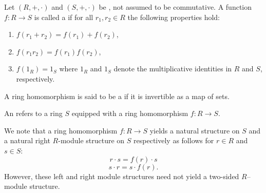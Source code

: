 \begin{definition} \label{definition:ring_homomorphism}
Let $(R,+,\cdot)$ and $(S,+,\cdot)$ be , not assumed to be commutative. A function $f: R \to S$ is called a  if for all $r_1,r_2 \in R$ the following properties hold:
\begin{enumerate}
    \item $f(r_1 + r_2) = f(r_1) + f(r_2)$,
    \item $f(r_1 r_2) = f(r_1) f(r_2)$,
    \item $f(1_R) = 1_S$ where $1_R$ and $1_S$ denote the multiplicative identities in $R$ and $S$, respectively.
\end{enumerate}
A ring homomorphism is said to be a  if it is invertible as a map of sets.

An  refers to a ring $S$ equipped with a ring homomorphism $f: R \to S$. 

We note that a ring homomorphism $f: R \to S$ yields a natural  structure on $S$ and a natural right $R$-module structure on $S$ respectively as follows for $r \in R$ and $s \in S$:
$$r \cdot s = f(r) \cdot s$$
$$s \cdot r = s \cdot f(r).$$
However, these left and right module structures need not yield a two-sided $R$--module structure.
\end{definition}
